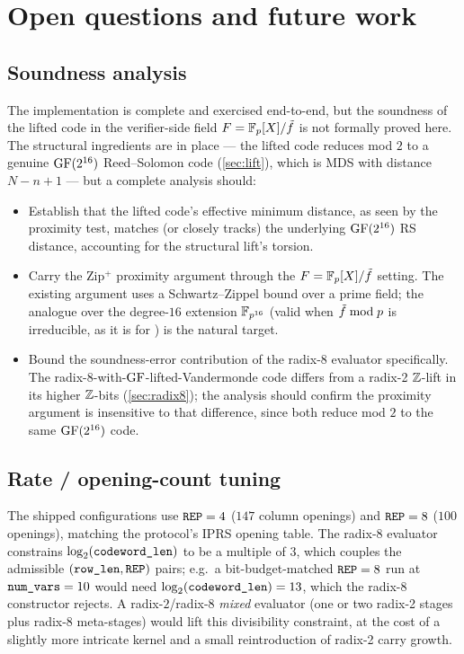 \section{Open questions and future work}
\label{sec:future-work}

\subsection{Soundness analysis}

The implementation is complete and exercised end-to-end, but the
soundness of the lifted code in the verifier-side field
$F = \mathbb{F}_p[X]/\tilde f$ is not formally proved here. The structural
ingredients are in place --- the lifted code reduces mod $2$ to a
genuine $\operatorname{GF}(2^{16})$ Reed--Solomon code (\autoref{sec:lift}), which
is MDS with distance $N - n + 1$ --- but a complete analysis should:
\begin{itemize}
  \item Establish that the lifted code's effective minimum distance,
    as seen by the proximity test, matches (or closely tracks) the
    underlying $\operatorname{GF}(2^{16})$ RS distance, accounting for the
    structural lift's torsion.
  \item Carry the Zip$^+$ proximity argument through the
    $F = \mathbb{F}_p[X]/\tilde f$ setting. The existing argument uses a
    Schwartz--Zippel bound over a prime field; the analogue over the
    degree-$16$ extension $\mathbb{F}_{p^{16}}$ (valid when $\tilde f \bmod p$
    is irreducible, as it is for ) is the natural
    target.
  \item Bound the soundness-error contribution of the radix-8
    evaluator specifically. The radix-8-with-$\operatorname{GF}$-lifted-Vandermonde
    code differs from a radix-2 $\mathbb{Z}$-lift in its higher $\mathbb{Z}$-bits
    (\autoref{sec:radix8}); the analysis should confirm the proximity
    argument is insensitive to that difference, since both reduce mod
    $2$ to the same $\operatorname{GF}(2^{16})$ code.
\end{itemize}

\subsection{Rate / opening-count tuning}

The shipped configurations use $\texttt{REP} = 4$ ($147$ column
openings) and $\texttt{REP} = 8$ ($100$ openings), matching the
protocol's IPRS opening table. The radix-8 evaluator constrains
$\log_2(\texttt{codeword\_len})$ to be a multiple of $3$, which couples
the admissible $(\texttt{row\_len}, \texttt{REP})$ pairs; e.g.\ a
bit-budget-matched $\texttt{REP} = 8$ run at $\texttt{num\_vars} = 10$
would need $\log_2(\texttt{codeword\_len}) = 13$, which the radix-8
constructor rejects. A radix-$2$/radix-$8$ \emph{mixed} evaluator
(one or two radix-2 stages plus radix-8 meta-stages) would lift this
divisibility constraint, at the cost of a slightly more intricate
kernel and a small reintroduction of radix-2 carry growth.

